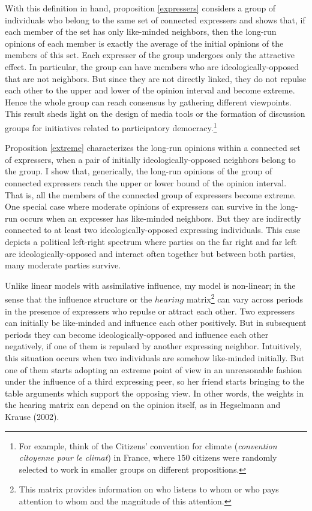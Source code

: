 \documentclass{article}
\begin{document}
With this definition in hand, proposition \ref{expressers} considers a group of individuals who belong to the same set of connected expressers and shows that, if each member of the set has only like-minded neighbors, then the long-run opinions of each member is exactly the average of the initial opinions of the members of this set. Each expresser of the group undergoes only the attractive effect. In particular, the group can have members who are ideologically-opposed that are not neighbors. But since they are not directly linked, they do not repulse each other to the upper and lower of the opinion interval and become extreme. Hence the whole group can reach consensus by gathering different viewpoints. This result sheds light on the design of media tools or the formation of discussion groups for initiatives related to participatory democracy.\footnote{For example, think of the Citizens' convention for climate (\textit{convention citoyenne pour le climat}) in France, where $150$ citizens were randomly selected to work in smaller groups on different propositions. } 

Proposition \ref{extreme} characterizes the long-run opinions within a connected set of expressers, when a pair of initially ideologically-opposed neighbors belong to the group. I show that, generically, the long-run opinions of the group of connected expressers reach the upper or lower bound of the opinion interval. That is, all the members of the connected group of expressers become extreme. One special case where  moderate opinions of expressers can survive in the long-run occurs when an expresser has like-minded neighbors. But they are indirectly connected to at least two ideologically-opposed expressing individuals. This case depicts a political left-right spectrum where parties on the far right and far left are ideologically-opposed and interact often together but between both parties, many moderate parties survive. 

\bigskip

Unlike linear models with assimilative influence, my model is non-linear; in the sense that the influence structure or the $hearing$ matrix\footnote{This matrix provides information on who listens to whom or who pays attention to whom and the magnitude of this attention.} can vary across periods in the presence of expressers who repulse or attract each other. Two expressers can initially be like-minded and influence each other positively. But in subsequent periods they can become ideologically-opposed and influence each other negatively, if one of them is repulsed by another expressing neighbor. Intuitively, this situation occurs when two individuals are somehow like-minded initially. But one of them starts adopting an extreme point of view in an unreasonable fashion under the influence of a third expressing peer, so her friend starts bringing to the table arguments which support the opposing view.  In other words, the weights in the hearing matrix can depend on the opinion itself, as in Hegselmann and Krause (2002)\cite{hegselmann}.
\end{document}

